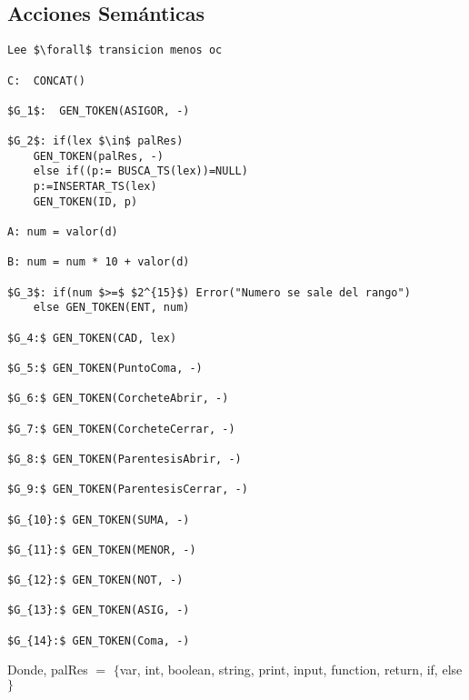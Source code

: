 \documentclass[a4paper, 12pt]{article}
\begin{document}
\newpage
\subsection{Acciones Semánticas}
\lstset{
  basicstyle=\mdseries,
  xleftmargin=3em,
  mathescape=true
}

\begin{lstlisting}
Lee $\forall$ transicion menos oc

C:  CONCAT()

$G_1$:  GEN_TOKEN(ASIGOR, -)

$G_2$: if(lex $\in$ palRes)
	GEN_TOKEN(palRes, -)
    else if((p:= BUSCA_TS(lex))=NULL)
	p:=INSERTAR_TS(lex)
	GEN_TOKEN(ID, p)

A: num = valor(d)

B: num = num * 10 + valor(d)

$G_3$: if(num $>=$ $2^{15}$) Error("Numero se sale del rango")
    else GEN_TOKEN(ENT, num)

$G_4:$ GEN_TOKEN(CAD, lex)

$G_5:$ GEN_TOKEN(PuntoComa, -)

$G_6:$ GEN_TOKEN(CorcheteAbrir, -)

$G_7:$ GEN_TOKEN(CorcheteCerrar, -)

$G_8:$ GEN_TOKEN(ParentesisAbrir, -)

$G_9:$ GEN_TOKEN(ParentesisCerrar, -)

$G_{10}:$ GEN_TOKEN(SUMA, -)

$G_{11}:$ GEN_TOKEN(MENOR, -)

$G_{12}:$ GEN_TOKEN(NOT, -)

$G_{13}:$ GEN_TOKEN(ASIG, -)

$G_{14}:$ GEN_TOKEN(Coma, -)	
\end{lstlisting}
Donde, palRes $=$ $\{$var, int, boolean, string, print, input, function, return, if, else$\}$
\newline
\end{document}
